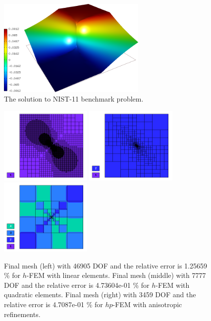 \documentclass[12pt]{elsarticle}
\begin{document}
\begin{figure}[H]
\centering
\includegraphics[height=4.7cm]{nist/nist-11/solution.png}
\caption{The solution to NIST-11 benchmark problem.}
\vspace{-8mm}
\label{fig:sln-nist11}
\end{figure}

\begin{figure}[H]
\centering
\includegraphics[height=3.7cm]{nist/nist-11/mesh_h1_aniso.png}
\includegraphics[height=3.7cm]{nist/nist-11/mesh_h2_aniso.png}
\includegraphics[height=3.7cm]{nist/nist-11/mesh_hp_aniso.png}
\vspace{-3mm}
\caption{
Final mesh (left) with 46905 DOF and the relative error is 1.25659 \% for $h$-FEM with linear elements.
Final mesh (middle) with 7777 DOF and the relative error is 4.73604e-01 \% for $h$-FEM with quadratic elements.
Final mesh (right) with 3459 DOF and the relative error is 4.7087e-01 \% for $hp$-FEM with anisotropic refinements.}
\vspace{-2mm}
\label{fig:nist-11-hp-aniso}
\end{figure}
\end{document}
